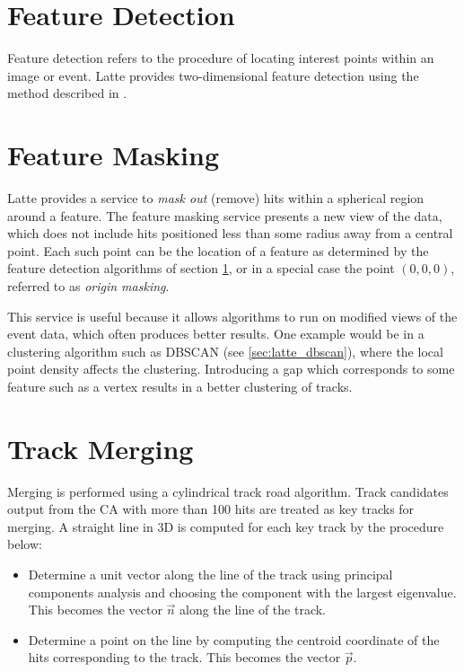 \section{Feature Detection}\label{sec:latte_feature_detection}
Feature detection refers to the procedure of locating interest points within an image or event. Latte provides two-dimensional feature detection using the method described in \citep{Morgan2010}. 

\section{Feature Masking}
Latte provides a service to \emph{mask out} (remove) hits within a spherical region around a feature. The feature masking service presents a new view of the data, which does not include hits positioned less than some radius away from a central point. Each such point can be the location of a feature as determined by the feature detection algorithms of section \ref{sec:latte_feature_detection}, or in a special case the point $(0,0,0)$, referred to as \emph{origin masking}.

This service is useful because it allows algorithms to run on modified views of the event data, which often produces better results. One example would be in a clustering algorithm such as DBSCAN (see \ref{sec:latte_dbscan}), where the local point density affects the clustering. Introducing a gap which corresponds to some feature such as a vertex results in a better clustering of tracks.

\section{Track Merging}\label{sec:cellularautomaton_merging}
Merging is performed using a cylindrical track road algorithm. Track candidates output from the CA with more than 100 hits are treated as key tracks for merging. A straight line in 3D is computed for each key track by the procedure below:

\begin{itemize}
	\item Determine a unit vector along the line of the track using principal components analysis and choosing the component with the largest eigenvalue. This becomes the vector $\vec{n}$ along the line of the track.
	\item Determine a point on the line by computing the centroid coordinate of the hits corresponding to the track. This becomes the vector $\vec{p}$.
\end{itemize}

